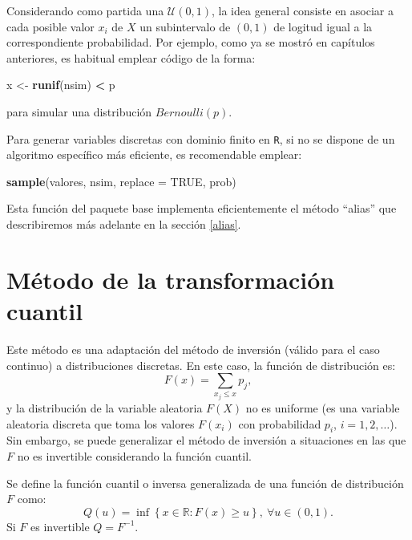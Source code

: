 \documentclass[]{book}
\newenvironment{Shaded}{\begin{snugshade}}{\end{snugshade}}
\newcommand{\KeywordTok}[1]{\textcolor[rgb]{0.13,0.29,0.53}{\textbf{#1}}}
\newcommand{\DataTypeTok}[1]{\textcolor[rgb]{0.13,0.29,0.53}{#1}}
\newcommand{\StringTok}[1]{\textcolor[rgb]{0.31,0.60,0.02}{#1}}
\newcommand{\OtherTok}[1]{\textcolor[rgb]{0.56,0.35,0.01}{#1}}
\newcommand{\OperatorTok}[1]{\textcolor[rgb]{0.81,0.36,0.00}{\textbf{#1}}}
\newcommand{\NormalTok}[1]{#1}
\theoremstyle{definition}
\theoremstyle{definition}
\theoremstyle{definition}
\theoremstyle{remark}
\begin{document}
Considerando como partida una \(\mathcal{U}\left( 0,1\right)\), la idea
general consiste en asociar a cada posible valor \(x_{i}\) de \(X\) un
subintervalo de \(\left( 0,1\right)\) de logitud igual a la
correspondiente probabilidad. Por ejemplo, como ya se mostró en
capítulos anteriores, es habitual emplear código de la forma:

\begin{Shaded}
\begin{Highlighting}[]
\NormalTok{x <-}\StringTok{ }\KeywordTok{runif}\NormalTok{(nsim) }\OperatorTok{<}\StringTok{ }\NormalTok{p}
\end{Highlighting}
\end{Shaded}

para simular una distribución \(Bernoulli(p)\).

Para generar variables discretas con dominio finito en \texttt{R}, si no
se dispone de un algoritmo específico más eficiente, es recomendable
emplear:

\begin{Shaded}
\begin{Highlighting}[]
\KeywordTok{sample}\NormalTok{(valores, nsim, }\DataTypeTok{replace =} \OtherTok{TRUE}\NormalTok{, prob)}
\end{Highlighting}
\end{Shaded}

Esta función del paquete base implementa eficientemente el método
``alias'' que describiremos más adelante en la sección \ref{alias}.

\section{Método de la transformación
cuantil}\label{metodo-de-la-transformacion-cuantil}

Este método es una adaptación del método de inversión (válido para el
caso continuo) a distribuciones discretas. En este caso, la función de
distribución es: \[F\left( x\right)  =\sum_{x_{j}\leq x}p_{j},\] y la
distribución de la variable aleatoria \(F\left( X\right)\) no es
uniforme (es una variable aleatoria discreta que toma los valores
\(F\left( x_{i} \right)\) con probabilidad \(p_{i}\), \(i=1,2,\ldots\)).
Sin embargo, se puede generalizar el método de inversión a situaciones
en las que \(F\) no es invertible considerando la función cuantil.

Se define la función cuantil o inversa generalizada de una función de
distribución \(F\) como:
\[Q\left( u\right) =\inf \left\{ x\in \mathbb{R}:F\left( x\right) \geq
u\right\} ,\ \forall u\in \left( 0,1\right).\] Si \(F\) es invertible
\(Q=F^{-1}\).
\end{document}
